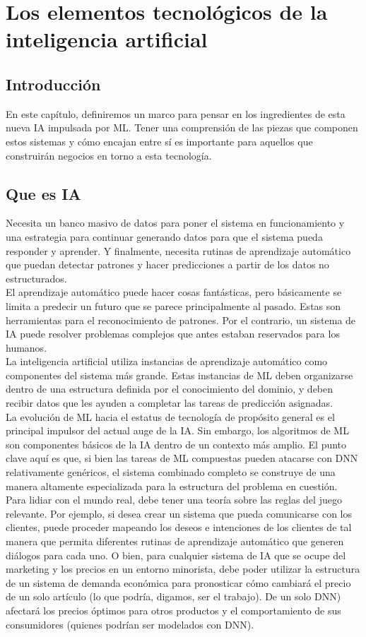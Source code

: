 \chapter{Los elementos tecnológicos de la inteligencia artificial}

\section{Introducción}
En este capítulo, definiremos un marco para pensar en los ingredientes de esta nueva IA impulsada por ML. Tener una comprensión de las piezas que componen estos sistemas y cómo encajan entre sí es importante para aquellos que construirán negocios en torno a esta tecnología.

\section{Que es IA}
Necesita un banco masivo de datos para poner el sistema en funcionamiento y una estrategia para continuar generando datos para que el sistema pueda responder y aprender. Y finalmente, necesita rutinas de aprendizaje automático que puedan detectar patrones y hacer predicciones a partir de los datos no estructurados.\\
El aprendizaje automático puede hacer cosas fantásticas, pero básicamente se limita a predecir un futuro que se parece principalmente al pasado. Estas son herramientas para el reconocimiento de patrones. Por el contrario, un sistema de IA puede resolver problemas complejos que antes estaban reservados para los humanos.\\
La inteligencia artificial utiliza instancias de aprendizaje automático como componentes del sistema más grande. Estas instancias de ML deben organizarse dentro de una estructura definida por el conocimiento del dominio, y deben recibir datos que les ayuden a completar las tareas de predicción asignadas.\\
La evolución de ML hacia el estatus de tecnología de propósito general es el principal impulsor del actual auge de la IA. Sin embargo, los algoritmos de ML son componentes básicos de la IA dentro de un contexto más amplio. El punto clave aquí es que, si bien las tareas de ML compuestas pueden atacarse con DNN relativamente genéricos, el sistema combinado completo se construye de una manera altamente especializada para la estructura del problema en cuestión.\\
Para lidiar con el mundo real, debe tener una teoría sobre las reglas del juego relevante. Por ejemplo, si desea crear un sistema que pueda comunicarse con los clientes, puede proceder mapeando los deseos e intenciones de los clientes de tal manera que permita diferentes rutinas de aprendizaje automático que generen diálogos para cada uno. O bien, para cualquier sistema de IA que se ocupe del marketing y los precios en un entorno minorista, debe poder utilizar la estructura de un sistema de demanda económica para pronosticar cómo cambiará el precio de un solo artículo (lo que podría, digamos, ser el trabajo). De un solo DNN) afectará los precios óptimos para otros productos y el comportamiento de sus consumidores (quienes podrían ser modelados con DNN).\\
